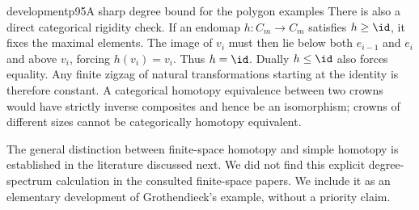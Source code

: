 \begin{dcomment}{development}{p95}{A sharp degree bound for the polygon examples}
There is also a direct categorical rigidity check. If an endomap $h:C_m\to C_m$ satisfies $h\geq\id$, it fixes the maximal elements. The image of $v_i$ must then lie below both $e_{i-1}$ and $e_i$ and above $v_i$, forcing $h(v_i)=v_i$. Thus $h=\id$. Dually $h\leq\id$ also forces equality. Any finite zigzag of natural transformations starting at the identity is therefore constant. A categorical homotopy equivalence between two crowns would have strictly inverse composites and hence be an isomorphism; crowns of different sizes cannot be categorically homotopy equivalent.

The general distinction between finite-space homotopy and simple homotopy is established in the literature discussed next. We did not find this explicit degree-spectrum calculation in the consulted finite-space papers. We include it as an elementary development of Grothendieck's example, without a priority claim.
\end{dcomment}

